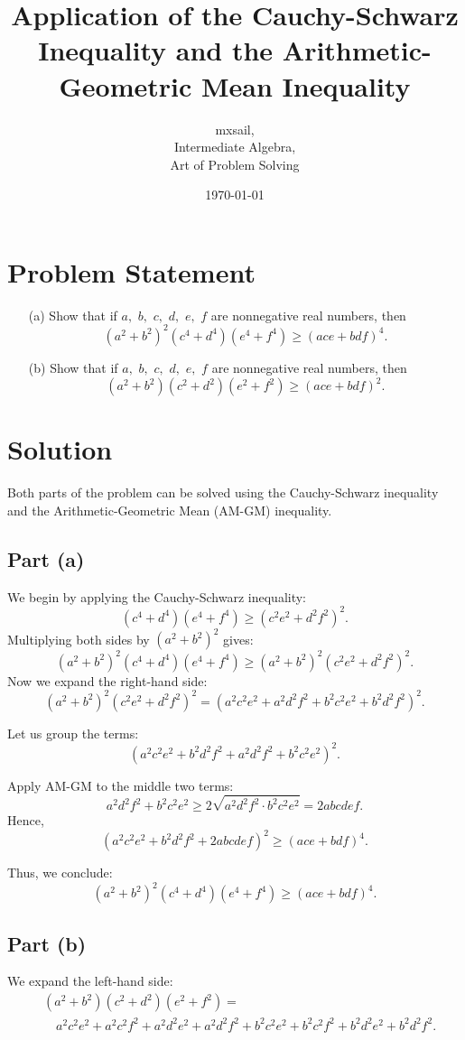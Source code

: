 \documentclass{article}
\title{Application of the Cauchy-Schwarz Inequality and the Arithmetic-Geometric Mean Inequality}
\author{mxsail,\\Intermediate Algebra,\\Art of Problem Solving}
\date{\today}
\begin{document}
\maketitle

\section*{Problem Statement}
\begin{enumerate}
    \item[(a)] Show that if $a,$ $b,$ $c,$ $d,$ $e,$ $f$ are nonnegative real numbers, then
    \[
    (a^2 + b^2)^2 (c^4 + d^4)(e^4 + f^4) \ge (ace + bdf)^4.
    \]
    \item[(b)] Show that if $a,$ $b,$ $c,$ $d,$ $e,$ $f$ are nonnegative real numbers, then
    \[
    (a^2 + b^2)(c^2 + d^2)(e^2 + f^2) \ge (ace + bdf)^2.
    \]
\end{enumerate}

\section*{Solution}
Both parts of the problem can be solved using the Cauchy-Schwarz inequality and the Arithmetic-Geometric Mean (AM-GM) inequality.

\subsection*{Part (a)}
We begin by applying the Cauchy-Schwarz inequality:
\[
(c^4 + d^4)(e^4 + f^4) \ge (c^2e^2 + d^2f^2)^2.
\]
Multiplying both sides by $(a^2 + b^2)^2$ gives:
\[
(a^2 + b^2)^2(c^4 + d^4)(e^4 + f^4) \ge (a^2 + b^2)^2(c^2e^2 + d^2f^2)^2.
\]
Now we expand the right-hand side:
\[
(a^2 + b^2)^2(c^2e^2 + d^2f^2)^2 = \left(a^2c^2e^2 + a^2d^2f^2 + b^2c^2e^2 + b^2d^2f^2\right)^2.
\]

Let us group the terms:
\[
\left(a^2c^2e^2 + b^2d^2f^2 + a^2d^2f^2 + b^2c^2e^2\right)^2.
\]

Apply AM-GM to the middle two terms:
\[
a^2d^2f^2 + b^2c^2e^2 \ge 2\sqrt{a^2d^2f^2 \cdot b^2c^2e^2} = 2abcdef.
\]
Hence,
\[
\left(a^2c^2e^2 + b^2d^2f^2 + 2abcdef\right)^2 \ge (ace + bdf)^4.
\]

Thus, we conclude:
\[
(a^2 + b^2)^2(c^4 + d^4)(e^4 + f^4) \ge (ace + bdf)^4.
\]

\subsection*{Part (b)}
We expand the left-hand side:
\begin{align*}
&(a^2 + b^2)(c^2 + d^2)(e^2 + f^2) = \\
&\quad a^2c^2e^2 + a^2c^2f^2 + a^2d^2e^2 + a^2d^2f^2 + b^2c^2e^2 + b^2c^2f^2 + b^2d^2e^2 + b^2d^2f^2.
\end{align*}
\end{document}
